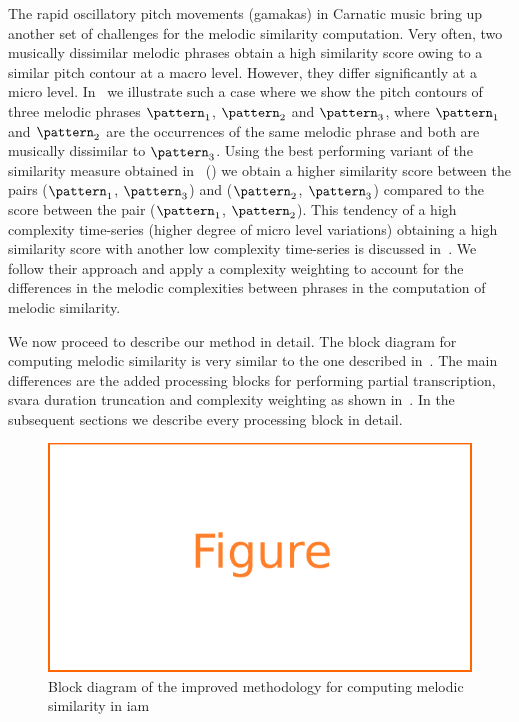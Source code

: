 The rapid oscillatory pitch movements (\glspl{gamaka}) in Carnatic music bring up another set of challenges for the melodic similarity computation. Very often, two musically dissimilar melodic phrases obtain a high similarity score owing to a similar pitch contour at a macro level. However, they differ significantly at a micro level. In~ we illustrate such a case where we show the pitch contours of three melodic phrases $\pattern_1$, $\pattern_2$ and $\pattern_3$, where $\pattern_1$ and $\pattern_2$ are the occurrences of the same melodic phrase and both are musically dissimilar to $\pattern_3$. Using the best performing variant of the similarity measure obtained in~ () we obtain a higher similarity score between the pairs ($\pattern_1$, $\pattern_3$) and ($\pattern_2$, $\pattern_3$) compared to the score between the pair ($\pattern_1$, $\pattern_2$). This tendency of a high complexity time-series (higher degree of micro level variations) obtaining a high similarity score with another low complexity time-series is discussed in~\cite{batista2011complexity}. We follow their approach and apply a complexity weighting to account for the differences in the melodic complexities between phrases in the computation of melodic similarity. 


We now proceed to describe our method in detail. The block diagram for computing melodic similarity is very similar to the one described in~. The main differences are the added processing blocks for performing partial transcription, \gls{svara} duration truncation and complexity weighting as shown in~. In the subsequent sections we describe every processing block in detail. 

\begin{figure}
	\begin{center}
		\includegraphics[width=\figSizeEightyFive]{ch06_patterns/figures/figure_todo.pdf}
	\end{center}
	\caption{Block diagram of the improved methodology for computing melodic similarity in \gls{iam}} 
	\label{fig:block_diagram_melodic_similarity_improved}
\end{figure}

